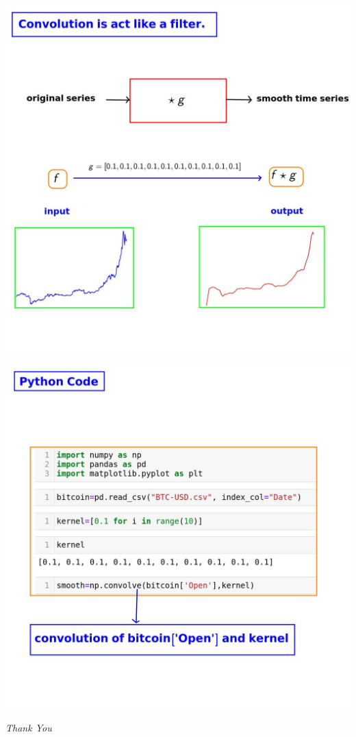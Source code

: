 \documentclass[12pt,aspectratio=169]{beamer}
\begin{document}
\begin{frame}
\begin{center}
\includegraphics[scale=0.3]{./pictures/5}
\end{center}
\end{frame}


\begin{frame}
\begin{center}
\includegraphics[scale=0.3]{./pictures/6}
\end{center}
\end{frame}


\begin{frame}{}
  \centering \Huge
  \emph{Thank You}
\end{frame}
\end{document}
